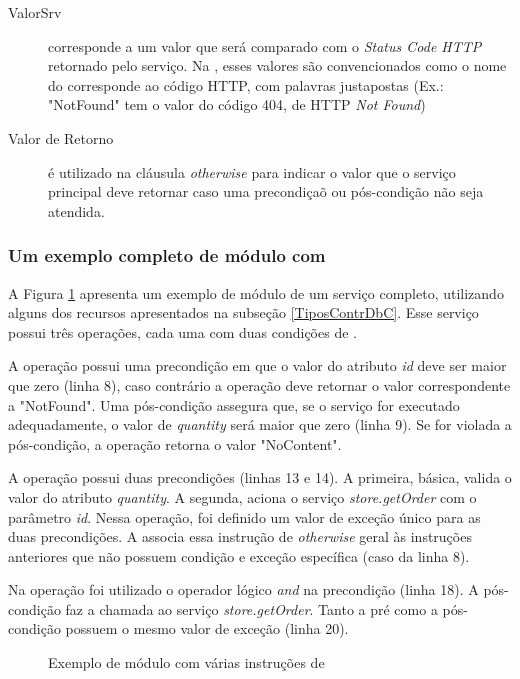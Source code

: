 \begin{description}
 \item [ValorSrv] corresponde a um valor que será comparado com o
 \textit{Status Code HTTP} retornado pelo serviço. Na \neoidl{}, esses valores
 são convencionados como o nome do corresponde ao código HTTP, com palavras
 justapostas (Ex.: "NotFound" tem o valor do código 404, de HTTP \textit{Not
 Found})

\item [Valor de Retorno] é utilizado na cláusula \emph{otherwise} para indicar o
valor que o serviço principal deve retornar caso uma precondiçaõ ou pós-condição
não seja atendida.

\end{description}


\subsubsection{Um exemplo completo de módulo com \designbycontract{}}

A Figura \ref{lst:ModuloNeoVariosDbC} apresenta um exemplo de módulo \neoidl{}
de um serviço completo, utilizando alguns dos recursos apresentados na subseção
\ref{TiposContrDbC}. Esse serviço possui três operações, cada uma com duas
condições de \designbycontract{}.

A operação  possui uma precondição em que o valor do atributo \emph{id} deve ser maior que zero (linha 8), caso contrário a operação deve retornar o valor
correspondente a "NotFound". Uma pós-condição assegura que, se o serviço for
executado adequadamente, o valor de \emph{quantity} será maior que zero (linha
9). Se for violada a pós-condição, a operação  retorna o valor
"NoContent".

A operação  possui duas precondições (linhas 13 e 14). A primeira,
básica, valida o valor do atributo \emph{quantity}. A segunda, aciona o serviço
\emph{store.getOrder} com o parâmetro \emph{id}. Nessa operação, foi
definido um valor de exceção único para as duas precondições. A \neoidl{}
associa essa instrução de \emph{otherwise} geral às instruções anteriores que
não possuem condição e exceção específica (caso da linha 8).

Na operação  foi utilizado o operador lógico \emph{and} na
precondição (linha 18). A pós-condição faz a chamada ao serviço
\emph{store.getOrder}. Tanto a pré como a pós-condição possuem o mesmo valor de
exceção (linha 20). 

\begin{figure}[htb]
\begin{small}

\end{small}
\caption{Exemplo de módulo \neoidl{} com várias instruções de \designbycontract{}}
\label{lst:ModuloNeoVariosDbC}
\end{figure} 	



